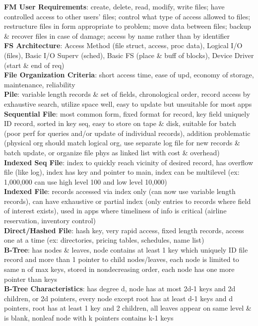 \documentclass[a4paper]{article}
\begin{document}
\begin{multicols}{2}
        \textbf{FM User Requirements}: create, delete, read, modify, write files; have controlled access to other users' files; control what type of access allowed to files; restructure files in form appropriate to problem; move data between files; backup \& recover files in case of damage; access by name rather than by identifier\\
        \textbf{FS Architecture}: Access Method (file struct, access, proc data), Logical I/O (files), Basic I/O Superv (sched), Basic FS (place \& buff of blocks), Device Driver (start \& end of req)\\
        \textbf{File Organization Criteria}: short access time, ease of upd, economy of storage, maintenance, reliability\\
        \textbf{Pile}: variable length records \& set of fields, chronological order, record access by exhaustive search, utilize space well, easy to update but unsuitable for most apps\\
        \textbf{Sequential File}: most common form, fixed format for record, key field uniquely ID record, sorted in key seq, easy to store on tape \& disk, suitable for batch (poor perf for queries and/or update of individual records), addition problematic (physical org should match logical org, use separate log file for new records \& batch update, or organize file phys as linked list with cost \& overhead)\\
        \textbf{Indexed Seq File}: index to quickly reach vicinity of desired record, has overflow file (like log), index has key and pointer to main, index can be multilevel (ex: 1,000,000 can use high level 100 and low level 10,000)\\
        \textbf{Indexed File}: records accessed via index only (can now use variable length records), can have exhaustive or partial index (only entries to records where field of interest exists), used in apps where timeliness of info is critical (airline reservation, inventory control)\\
        \textbf{Direct/Hashed File}: hash key, very rapid access, fixed length records, access one at a time (ex: directories, pricing tables, schedules, name list)\\
        \textbf{B-Tree}: has nodes \& leaves, node contains at least 1 key which uniquely ID file record and more than 1 pointer to child nodes/leaves, each node is limited to same n of max keys, stored in nondecreasing order, each node has one more pointer than keys\\
        \textbf{B-Tree Characteristics}: has degree d, node has at most 2d-1 keys and 2d children, or 2d pointers, every node except root has at least d-1 keys and d pointers, root has at least 1 key and 2 children, all leaves appear on same level \& is blank, nonleaf node with k pointers contains k-1 keys\\

\end{multicols}
\end{document}
